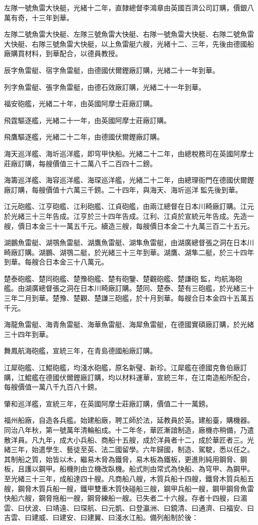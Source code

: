 \begin{pinyinscope}
左隊一號魚雷大快艇，光緒十二年，直隸總督李鴻章由英國百濟公司訂購，價銀八萬有奇，十三年到華。

左隊二號魚雷大快艇、左隊三號魚雷大快艇、右隊一號魚雷大快艇、右隊二號魚雷大快艇、右隊三號魚雷大快艇，以上魚雷艇六艘，光緒十二、三年，先後由德國船廠購買材料，到華配合，以德員教授。

辰字魚雷艇、宿字魚雷艇，由德國伏爾鏗廠訂購，光緒二十一年到華。

列字魚雷艇、張字魚雷艇，由德石效廠訂購，光緒二十一年到華。

福安砲艦，光緒二十年，由英國阿摩士莊廠訂購。

飛霆驅逐艦，光緒二十一年，由英國阿摩士莊廠訂購。

飛鷹驅逐艦，光緒二十二年，由德國伏爾鏗廠訂購。

海天巡洋艦、海圻巡洋艦，即穹甲快船。光緒二十二年，由總稅務司在英國阿摩士莊廠訂購，每艘價值三十二萬八千二百四十二鎊。

海籌巡洋艦、海容巡洋艦、海琛巡洋艦，光緒二十二年，由總理衙門在德國伏爾鏗廠訂購，每艘價值十六萬三千鎊。二十四年，與海天、海圻巡洋監先後到華。

江元砲艦、江亨砲艦、江利砲艦、江貞砲艦，由兩江總督在日本川畸廠訂購。江元於光緒三十三年告成。江亨於三十四年告成。江利、江貞於宣統元年告成。先造一艘，價日本金三十一萬五千元。續造三艘，每艘價日本金二十九萬三百二十五元。

湖鵬魚雷艇、湖鶚魚雷艇、湖鷹魚雷艇、湖隼魚雷艇，由湖廣總督張之洞在日本川畸廠訂購。湖鵬、湖鶚二艇，於光緒三十三年到華。湖鷹、湖隼二艇，於三十四年到華。每艘合日本金三十八萬元。

楚泰砲艦、楚同砲艦、楚豫砲艦、楚有砲鑒、楚觀砲艦、楚謙砲監，均航海砲艦。由湖廣總督張之洞在日本川畸廠訂購。楚同、楚泰、楚有三砲艦，於光緒三十三年二月到華。楚豫、楚觀、楚謙三砲艦，於十月到華。每艘合日本金四十五萬五千元。

海龍魚雷艇、海青魚雷艇、海華魚雷艇、海犀魚雷艇，在德國實碩廠訂購，於光緒三十四年到華。

舞鳳航海砲艦，宣統三年，在青島德國船廠訂購。

江犀砲艦、江鯤砲艦，均淺水砲艦，原名新璧、新珍。江犀艦在德國克魯伯廠訂購，江鯤艦在德國伏爾鏗廠訂購，均以材料運華，宣統三年，在江南造船所配合，每艘價值一萬八千九百八十鎊。

肇和巡洋艦，宣統三年，在英國阿摩士莊廠訂購，價值二十一萬鎊。

福州船廠，自造各兵艦。始建船廠，聘工師於法，延教員於英。建船臺，購機器。同治八年秋，第一號萬年清輪船成。十二年冬，華匠漸諳制造，廠機亦稍備，乃遣散洋員。凡九年，成大小兵船、商船十五艘，成於洋員者十二，成於華匠者三。光緒三年，始遣學生、藝徒至英、法二國留學。六年歸國，制造、駕駛，悉以任之。其制船之質，始皆以木，繼易木脅為鐵脅，易木板為鐵板，更進則純用鋼脅、鋼板，且護以鋼甲。船機則由立機改臥機。船式則由常式為快船、為穹甲、為鋼甲。至光緒三十三年，成船達四十艘。凡商船八艘，木質兵船十四艘，鐵脅木質兵船五艘，鋼脅木質兵船一艘，鐵甲雙重木質快碰船三艘，鋼甲兵船一艘，鋼甲鋼脅魚雷快船六艘，鋼脅拖船一艘，鋼脅練船一艘。已失者二十六艘。存者十四艘，曰湄雲、曰伏波、曰靖遠、曰琛航、曰元凱、曰登瀛洲、曰鏡清、曰通濟、曰福安、曰吉雲、曰建威、曰建安、曰建翼、曰淺水江船。備列船制於後：


\end{pinyinscope}
